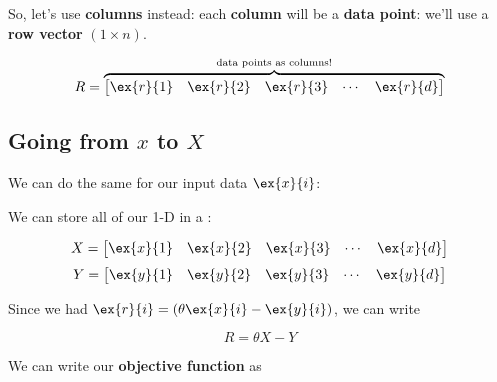         So, let's use \textbf{columns} instead: each \textbf{column} will be a \textbf{data point}: we'll use a \textbf{row vector} $(1 \times n)$. 
        
        \begin{equation}
            R =
            \overbrace{
            \begin{bmatrix}
              \ex{r}{1} & \ex{r}{2} & \ex{r}{3} & \cdots & \ex{r}{d} 
            \end{bmatrix}
            }^{\text{data points as columns!}}
        \end{equation}
        
    \subsection{Going from $x$ to $X$}
    
        We can do the same for our input data $\ex{x}{i}$:\\
        
        \begin{notation}
            We can store all of our 1-D  in a :
            
            \begin{equation*}
                X =
                \begin{bmatrix}
                  \ex{x}{1} & \ex{x}{2} & \ex{x}{3} & \cdots & \ex{x}{d}
                \end{bmatrix}
            \end{equation*}
            \begin{equation*}
                Y =
                \begin{bmatrix}
                  \ex{y}{1} & \ex{y}{2} & \ex{y}{3} & \cdots & \ex{y}{d}
                \end{bmatrix}
            \end{equation*}
        \end{notation}
        
        Since we had $\ex{r}{i} = (\theta \ex{x}{i} - \ex{y}{i} )$, we can write 
        
        \begin{equation}
            R = \theta X - Y
        \end{equation}
        
        We can write our \textbf{objective function} as
        
